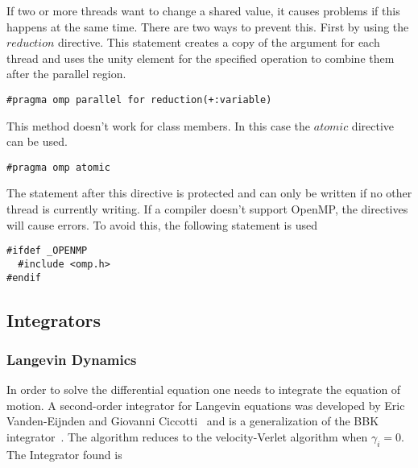 \documentclass[a4paper]{article}
\begin{document}
If two or more threads want to change a shared value, it causes problems if this happens at the same time. There are two ways to prevent this. First by using the $reduction$ directive. This statement creates a copy of the argument for each thread and uses the unity element for the specified operation to combine them after the parallel region. 

\begin{center}
\texttt{\#pragma omp parallel for reduction(+:variable)}
\end{center}

This method doesn't work for class members. In this case the $atomic$ directive can be used. 

\begin{center}
\texttt{\#pragma omp atomic}
\end{center}

The statement after this directive is protected and can only be written if no other thread is currently writing.
If a compiler doesn't support OpenMP, the directives will cause errors. To avoid this, the following statement is used

\begin{lstlisting}[caption={To avoid error messages if OpenMP is not installed}, label={c++:openmp_protection}]
#ifdef _OPENMP
  #include <omp.h>
#endif
\end{lstlisting}

\subsection{Integrators}

\subsubsection{Langevin Dynamics}


In order to solve the differential equation one needs to integrate the equation of motion. A second-order integrator for Langevin equations was developed by Eric Vanden-Eijnden and Giovanni Ciccotti~\cite{EricVanden-Eijnden2006} and is a generalization of the BBK integrator~\cite{BrungerA.1984}. The algorithm reduces to the velocity-Verlet algorithm when $\gamma_i = 0$. The Integrator found is
\end{document}

